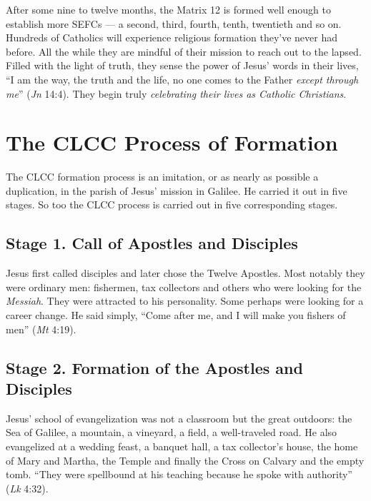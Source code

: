 \documentclass{article}
\begin{document}
After some nine to twelve months, the Matrix 12 is formed well enough to
establish more SEFCs --- a second, third, fourth, tenth, twentieth and so
on. Hundreds of Catholics will experience religious formation they've never had
before. All the while they are mindful of their mission to reach out to the
lapsed. Filled with the light of truth, they sense the power of Jesus' words in
their lives, ``I am the way, the truth and the life, no one comes to the Father
\emph{except through me}'' (\emph{Jn} 14:4). They begin truly \emph{celebrating
their lives as Catholic Christians}.


\section{The CLCC Process of Formation}

The CLCC formation process is an imitation, or as nearly as possible a
duplication, in the parish of Jesus' mission in Galilee. He carried it out in
five stages. So too the CLCC process is carried out in five corresponding
stages.


\subsection{Stage 1. Call of Apostles and Disciples}

Jesus first called disciples and later chose the Twelve Apostles. Most notably
they were ordinary men: fishermen, tax collectors and others who were looking
for the \emph{Messiah}. They were attracted to his personality. Some perhaps
were looking for a career change. He said simply, ``Come after me, and I will
make you fishers of men'' (\emph{Mt} 4:19).


\subsection{Stage 2. Formation of the Apostles and Disciples}

Jesus' school of evangelization was not a classroom but the great outdoors: the
Sea of Galilee, a mountain, a vineyard, a field, a well-traveled road. He also
evangelized at a wedding feast, a banquet hall, a tax collector's house, the
home of Mary and Martha, the Temple and finally the Cross on Calvary and the
empty tomb. ``They were spellbound at his teaching because he spoke with
authority'' (\emph{Lk} 4:32).
\end{document}
